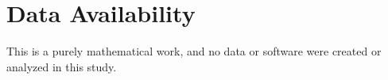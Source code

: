 \documentclass[aps,pra,reprint,superscriptaddress,amsmath,amssymb,floatfix]{revtex4-2}
\theoremstyle{plain}
\theoremstyle{definition}
\theoremstyle{remark}
\begin{document}
\section*{Data Availability}
This is a purely mathematical work, and no data or software were created or
analyzed in this study.


\end{document}
